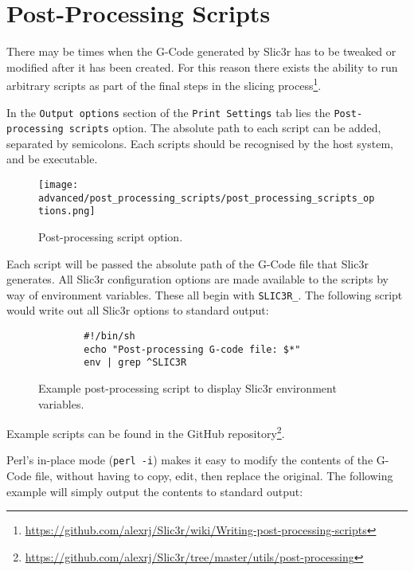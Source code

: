 
\section{Post-Processing Scripts} %
\label{sec:post_processing_scripts}

There may be times when the G-Code generated by Slic3r has to be tweaked or modified after it has been created.  For this reason there exists the ability to run arbitrary scripts as part of the final steps in the slicing process\footnote{\url{https://github.com/alexrj/Slic3r/wiki/Writing-post-processing-scripts}}.

In the \texttt{Output options} section of the \texttt{Print Settings} tab lies the \texttt{Post-processing scripts} option.  The absolute path to each script can be added, separated by semicolons. Each scripts should be recognised by the host system, and be executable.

\begin{figure}[H]
\centering
\texttt{[image: advanced/post\_processing\_scripts/post\_processing\_scripts\_options.png]}
\caption{Post-processing script option.}
\label{fig:post_processing_scripts_options}
\end{figure}

Each script will be passed the absolute path of the G-Code file that Slic3r generates.  All Slic3r configuration options are made available to the scripts by way of environment variables.  These all begin with \texttt{SLIC3R\_}.  The following script would write out all Slic3r options to standard output:

\begin{figure}[H]
\small
\begin{verbatim}
        #!/bin/sh
        echo "Post-processing G-code file: $*"
        env | grep ^SLIC3R
\end{verbatim}
\caption{Example post-processing script to display Slic3r environment variables.}
\label{fig:exaple_post_processing_script_env_vars}
\end{figure}

Example scripts can be found in the GitHub repository\footnote{\url{https://github.com/alexrj/Slic3r/tree/master/utils/post-processing}}.


Perl's in-place mode (\texttt{perl -i}) makes it easy to modify the contents of the G-Code file, without having to copy, edit, then replace the original.  The following example will simply output the contents to standard output:

